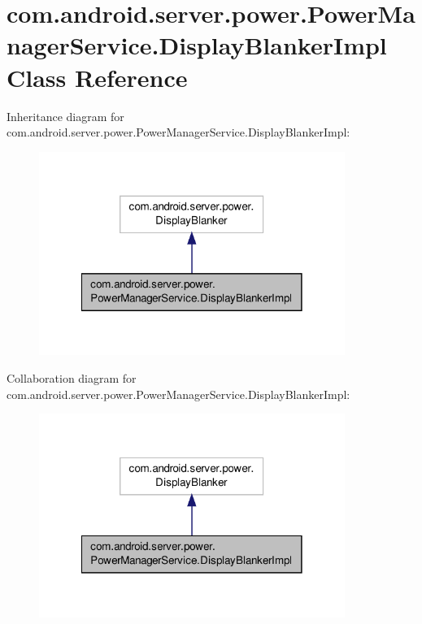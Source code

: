 \hypertarget{classcom_1_1android_1_1server_1_1power_1_1PowerManagerService_1_1DisplayBlankerImpl}{\section{com.\-android.\-server.\-power.\-Power\-Manager\-Service.\-Display\-Blanker\-Impl Class Reference}
\label{classcom_1_1android_1_1server_1_1power_1_1PowerManagerService_1_1DisplayBlankerImpl}
}


Inheritance diagram for com.\-android.\-server.\-power.\-Power\-Manager\-Service.\-Display\-Blanker\-Impl\-:
\nopagebreak
\begin{figure}[H]
\begin{center}
\leavevmode
\includegraphics[width=282pt]{classcom_1_1android_1_1server_1_1power_1_1PowerManagerService_1_1DisplayBlankerImpl__inherit__graph}
\end{center}
\end{figure}


Collaboration diagram for com.\-android.\-server.\-power.\-Power\-Manager\-Service.\-Display\-Blanker\-Impl\-:
\nopagebreak
\begin{figure}[H]
\begin{center}
\leavevmode
\includegraphics[width=282pt]{classcom_1_1android_1_1server_1_1power_1_1PowerManagerService_1_1DisplayBlankerImpl__coll__graph}
\end{center}
\end{figure}
